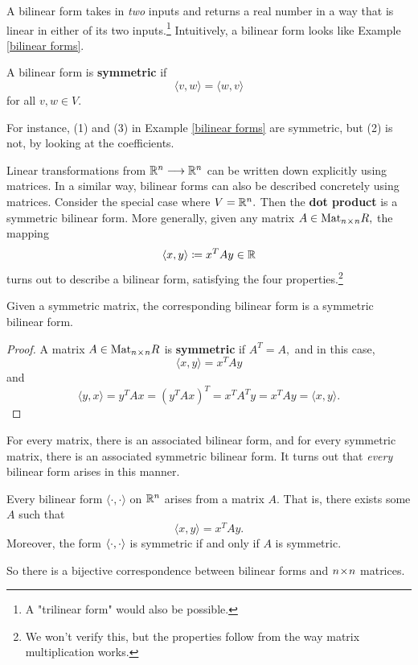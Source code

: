 A bilinear form takes in \emph{two} inputs and returns a real number in a way that is linear in either of its two inputs.\footnote{A "trilinear form" would also be possible.} Intuitively, a bilinear form looks like Example \ref{bilinear forms}.

\begin{definition}
A bilinear form is \textbf{symmetric} if \[\langle v, w \rangle = \langle w, v\rangle\] for all $v, w \in V.$
\end{definition}

For instance, (1) and (3) in Example \ref{bilinear forms} are symmetric, but (2) is not, by looking at the coefficients.

Linear transformations from $\mathbb R^n \longrightarrow \mathbb R^n$ can be written down explicitly using matrices. In a similar way, bilinear forms can also be described concretely using matrices. Consider the special case where $V = \mathbb R^n.$ Then the \textbf{dot product} is a symmetric bilinear form. More generally, given any matrix $A \in \text{Mat}_{n \hspace{0.05em}{\times}\hspace{0.05em} n}{R},$ the mapping \[\langle x, y \rangle \coloneqq x^T A y \in \mathbb R\] turns out to describe a bilinear form, satisfying the four properties.\footnote{We won't verify this, but the properties follow from the way matrix multiplication works.}

\begin{proposition}
Given a symmetric matrix, the corresponding bilinear form is a symmetric bilinear form.
\end{proposition}
\begin{proof}
A matrix $A \in \text{Mat}_{n \hspace{0.05em}{\times}\hspace{0.05em} n}{R}$ is \textbf{symmetric} if $A^T = A,$ and in this case, \[\langle x, y \rangle = x^TAy\] and \[\langle y, x \rangle = y^TAx = (y^TAx)^T = x^TA^Ty = x^TAy= \langle x, y \rangle.\]
\end{proof}

For every matrix, there is an associated bilinear form, and for every symmetric matrix, there is an associated symmetric bilinear form. It turns out that \emph{every} bilinear form arises in this manner.

\begin{proposition}\label{bilinear form comes from matrix}
Every bilinear form $\langle \cdot, \cdot \rangle$ on $\mathbb R^n$ arises from a matrix $A.$ That is, there exists some $A$ such that \[\langle x, y \rangle = x^{T} Ay.\] Moreover, the form $\langle \cdot, \cdot \rangle $ is symmetric if and only if $A$ is symmetric. 
\end{proposition}

So there is a bijective correspondence between bilinear forms and $n \hspace{0.05em}{\times}\hspace{0.05em} n$ matrices. 

